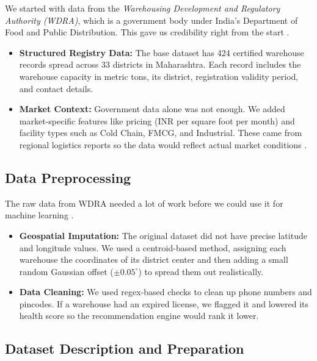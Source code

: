 \documentclass[pdflatex,sn-mathphys-num]{sn-jnl}
\theoremstyle{thmstyleone}
\theoremstyle{thmstyletwo}
\theoremstyle{thmstylethree}
\begin{document}
We started with data from the
\textit{Warehousing Development and Regulatory Authority (WDRA)},
which is a government body under India's Department of Food
and Public Distribution.
This gave us credibility right from the start \cite{b5}.
\begin{itemize}
    \item \textbf{Structured Registry Data:}
      The base dataset has 424 certified warehouse records
      spread across 33 districts in Maharashtra.
      Each record includes the warehouse capacity in metric
      tons, its district, registration validity period,
      and contact details.

    \item \textbf{Market Context:}
      Government data alone was not enough.
      We added market-specific features like pricing
      (INR per square foot per month) and facility types
      such as Cold Chain, FMCG, and Industrial.
      These came from regional logistics reports so the
      data would reflect actual market conditions
      \cite{b1}.
\end{itemize}


\subsection{Data Preprocessing}\label{subsec:preproc}

The raw data from WDRA needed a lot of work before we
could use it for machine learning \cite{b10}.
\begin{itemize}
    \item \textbf{Geospatial Imputation:}
      The original dataset did not have precise latitude
      and longitude values.
      We used a centroid-based method, assigning each
      warehouse the coordinates of its district center
      and then adding a small random Gaussian offset
      ($\pm 0.05^\circ$) to spread them out realistically.

    \item \textbf{Data Cleaning:}
      We used regex-based checks to clean up phone numbers
      and pincodes.
      If a warehouse had an expired license, we flagged it
      and lowered its health score so the recommendation
      engine would rank it lower.
\end{itemize}


\subsection{Dataset Description and Preparation}%
\label{subsec:dataset}
\end{document}
